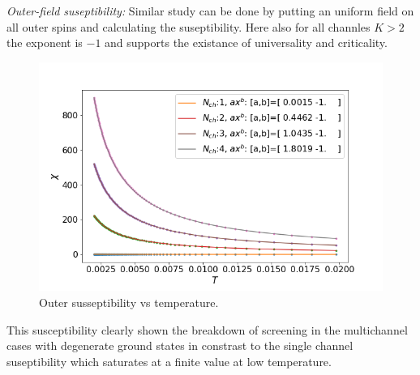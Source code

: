 \documentclass[reprint,prb,superscriptaddress]{revtex4-1}
\begin{document}
\textit{Outer-field suseptibility: } Similar study can be done by putting an uniform field on all outer spins and calculating the suseptibility. Here also for all channles $K>2$ the exponent is $-1$ and supports the existance of universality and criticality.
\begin{figure}
\centering
\includegraphics[scale=0.36]{plt/Outer_Field_Chi_Powerlaw_}
\caption{Outer susseptibility vs temperature.}
\label{fig:suseptibility_outer}
\end{figure}
This susceptibility clearly shown the breakdown of screening in the multichannel cases with degenerate ground states in constrast to the single channel suseptibility which saturates at a finite value at low temperature.
\end{document}
